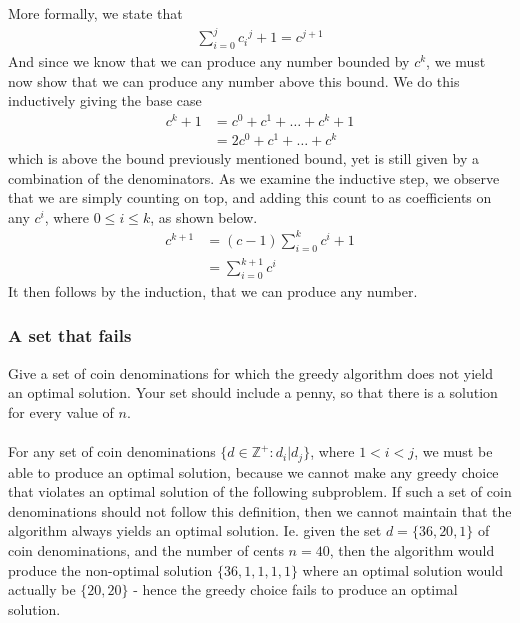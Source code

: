 \documentclass[11pt,english]{article}
\begin{document}
More formally, we state that
\begin{align}
	\sum_{i=0}^{j} c{_i}^{j} + 1 = c^{j+1}
\end{align}
And since we know that we can produce any number bounded by $c^k$, we must
now show that we can produce any number above this bound. We do this
inductively giving the base case
\begin{align}
	c^k + 1 &= c^0 + c^1 + \dots + c^k + 1\\
	&= 2c^0 + c^1 + \dots + c^k
\end{align}
which is above the bound previously mentioned bound, yet is still given by a
combination of the denominators. As we examine the inductive step, we observe
that we are simply counting on top, and adding this count to as coefficients
on any $c^i$, where $0 \leq i \leq k$, as shown below.
\begin{align}
	c^{k+1} &= (c - 1)\sum_{i=0}^{k}{c^i} + 1\\
	&= \sum_{i=0}^{k+1}{c^i} \nonumber
\end{align}
It then follows by the induction, that we can produce any number.

\subsubsection*{A set that fails}
\large{Give a set of coin denominations for which the greedy algorithm
does not yield an optimal solution. Your set should include a penny, so
that there is a solution for every value of $n$.}
\\\\
For any set of coin denominations
$\{d \in \mathbb{Z}^{+} : d_i | d_{j}\}$, where $1 < i < j$, we must be able to
produce an optimal solution, because we cannot make any greedy choice that
violates an optimal solution of the following subproblem. If such a set of
coin denominations should not follow this definition, then we cannot maintain
that the algorithm always yields an optimal solution. Ie. given the set
$d = \{36, 20, 1\}$ of coin denominations, and the number of cents $n = 40$,
then the algorithm would produce the non-optimal solution $\{36, 1, 1, 1, 1\}$
where an optimal solution would actually be $\{20, 20\}$ - hence the greedy
choice fails to produce an optimal solution.
\end{document}
